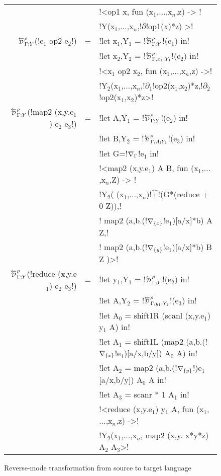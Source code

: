 \begin{figure*}[t]
\begin{tabular}{r c l}
            && !<op1 x, fun (x$_{1}$,$\ldots$,x$_n$,z) -> ! \\
            && !Y(x$_{1}$,$\ldots$,x$_n$,!$\partial$!op1(x)*z) >! \\
        $\directD{\rho}{\Gamma}{Y}$(!e$_{1}$ op2 e$_{2}$!) &=& 
            !let x$_{1}$,Y$_{1}$ = !$\directD{\rho}{\Gamma}{Y}$!(e$_{1}$) in! \\
            && !let x$_{2}$,Y$_{2}$ = !$\directD{\rho}{\Gamma,x_1}{Y_1}$!(e$_{2}$) in! \\
            && !<x$_{1}$ op2 x$_{2}$, fun (x$_{1}$,$\ldots$,x$_n$,z) ->! \\
            && !Y$_{2}$(x$_{1}$,$\ldots$,x$_n$,!$\partial_1$!op2(x$_{1}$,x$_{2}$)*z,!$\partial_2$!op2(x$_{1}$,x$_{2}$)*z>! \\
        $\directD{\rho}{\Gamma}{Y}$(!map2 (x,y.e$_{1}$) e$_{2}$ e$_{3}$!) &=&  
            !let A,Y$_{1}$ = !$\directD{\rho}{\Gamma}{Y}$!(e$_{2}$) in! \\
            && !let B,Y$_{2}$ = !$\directD{\rho}{\Gamma,A}{Y_1}$!(e$_{3}$) in! \\
            && !let G=!$\nabla_{\Gamma}$!e$_{1}$ in!\\
            && !<map2 (x,y.e$_{1}$) A B, fun (x$_{1}$,$\ldots$,x$_n$,Z) -> !\\
            && !Y$_{2}$( (x$_{1}$,$\ldots$,x$_n$)!$\widehat{+}$!(G*(reduce + 0 Z)),!\\
            && \quad\quad! map2 (a,b.(!$\nabla_{\{x\}}$!e$_{1}$)[a/x]*b) A Z,!\\
            && \quad\quad! map2 (a,b.(!$\nabla_{\{y\}}$!e$_{1}$)[a/x]*b) B Z )>!\\
        $\directD{\rho}{\Gamma}{Y}$(!reduce (x,y.e$_{1}$) e$_{2}$ e$_{3}$!) &=&
            !let y$_{1}$,Y$_{1}$ = !$\directD{\rho}{\Gamma}{Y}$!(e$_{2}$) in! \\
            && !let A,Y$_{2}$ = !$\directD{\rho}{\Gamma,y_1}{Y_1}$!(e$_{3}$) in! \\
            && !let A$_{0}$ = shift1R (scanl (x,y.e$_{1}$) y$_{1}$ A) in! \\
            && !let A$_{1}$ = shift1L (map2 (a,b.(!$\nabla_{\{x\}}$!e$_{1}$)[a/x,b/y]) A$_{0}$ A) in! \\
            && !let A$_{2}$ = map2 (a,b.(!$\nabla_{\{y\}}$!)e$_{1}$[a/x,b/y]) A$_{0}$ A in! \\
            && !let A$_{3}$ = scanr * 1 A$_{1}$ in! \\
            && !<reduce (x,y.e$_{1}$) y$_{1}$ A, fun (x$_{1}$,$\ldots$,x$_n$,z) ->! \\
            && !Y$_{2}$(x$_{1}$,$\ldots$,x$_n$, map2 (x,y. x*y*z) A$_{2}$ A$_{3}$>! \\
        \end{tabular}
    \caption{Reverse-mode transformation from source to target language}
    \label{fig:direct_diff_macro}    
\end{figure*}